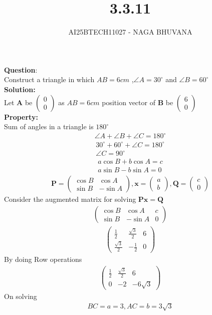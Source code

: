 \documentclass{beamer}
\title{3.3.11}
\author{AI25BTECH11027 - NAGA BHUVANA}
\theoremstyle{remark}
\newcommand{\myvec}[1]{\ensuremath{\begin{pmatrix}#1\end{pmatrix}}}
\let\vec\mathbf
\numberwithin{equation}{section}
\begin{document}
{\let\newpage\relax\maketitle}
\renewcommand{\thefigure}{\theenumi}
\renewcommand{\thetable}{\theenumi}
		\textbf{Question}:\\
		Construct a triangle in which $AB=6cm$ ,$\angle A=30^\circ$ and $\angle B=60^\circ$\\
\textbf{Solution:}\\
Let $\vec{A}$ be $\myvec{0\\0}$ as $AB=6 cm$ position vector of $\vec{B}$ be $\myvec{6\\0}$\\
\textbf{Property:}\\
Sum of angles in a triangle is $180^\circ$\\
\begin{align}
    \angle A+\angle B+\angle C=180^\circ
\end{align}
\begin{align}
    30^\circ+60^\circ+\angle C=180^\circ\\
    \angle C=90^\circ
\end{align}
\begin{align}
    a \cos B+b \cos A=c\\
    a \sin B-b \sin A=0	
\end{align}
       \begin{align}
	       \vec{P}=\myvec{\cos B & \cos A\\ \sin B & -\sin A},\vec{x}=\myvec{a\\b},\vec{Q}=\myvec{c\\0}
       \end{align} 
Consider the augmented matrix for solving $\vec{P}\vec{x}=\vec{Q}$
\begin{align}
	\myvec{\cos B &\cos A & c\\ \sin B & -\sin A &0}
\end{align}
\begin{align}
	\myvec{\frac{1}{2} & \frac{\sqrt{3}}{2}&6\\ \frac{\sqrt{3}}{2} & -\frac{1}{2}&0}
\end{align}
By doing Row operations\\
\begin{align}
	\myvec{\frac{1}{2} & \frac{\sqrt{3}}{2}&6\\0&-2&-6\sqrt{3}}
\end{align}
On solving
\begin{align}
	BC=a=3,AC=b=3\sqrt{3}
\end{align}
\end{document}
